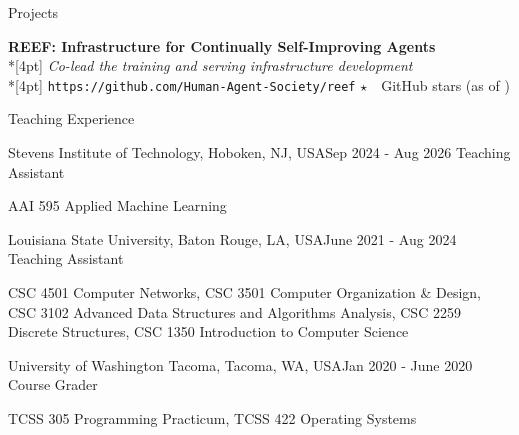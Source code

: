 \documentclass{resume} %
\begin{document}
\begin{rSection}{Projects}

\textbf{REEF: Infrastructure for Continually Self-Improving Agents}\\*[4pt]
\textit{Co-lead the training and serving infrastructure development}\\*[4pt]
\texttt{https://github.com/Human-Agent-Society/reef} \hfill
{\small $\star$\ \ReefGitHubStarsCompact\ GitHub stars (as of \ReefGitHubStarsAsOf)}

\end{rSection}


\begin{rSection}{Teaching Experience}

\begin{rSubsection}{Stevens Institute of Technology, Hoboken, NJ, USA}{Sep 2024 - Aug 2026}
{Teaching Assistant} \
\item AAI 595 Applied Machine Learning
\end{rSubsection}

\begin{rSubsection}{Louisiana State University, Baton Rouge, LA, USA}{June 2021 - Aug 2024}
{Teaching Assistant} \
\item CSC 4501 Computer Networks, CSC 3501 Computer Organization \& Design, CSC 3102 Advanced Data Structures and Algorithms Analysis, CSC 2259 Discrete Structures, CSC 1350 Introduction to Computer Science
\end{rSubsection}

\begin{rSubsection}{University of Washington Tacoma, Tacoma, WA, USA}{Jan 2020 - June 2020}
{Course Grader} \
\item TCSS 305 Programming Practicum, TCSS 422 Operating Systems
\end{rSubsection}

\end{rSection}


\end{document}
